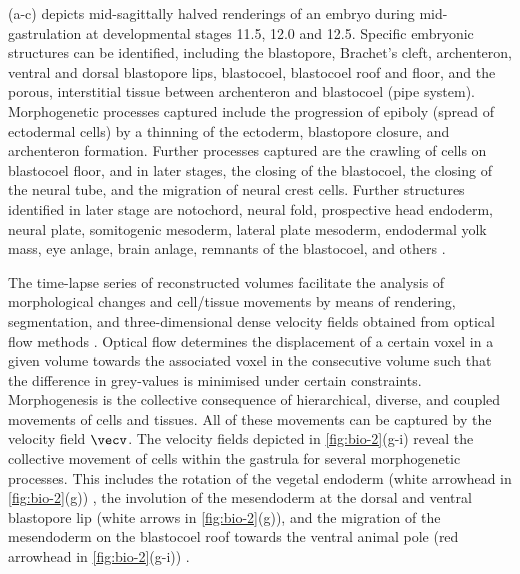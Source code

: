 \documentclass[
twoside,
openright,
titlepage,
numbers=noenddot,
headinclude,
fleqn,
a4paper,
footinclude=true,
cleardoublepage=empty,
abstractoff,
BCOR=5mm,
paper=a4,
fontsize=11pt,
british,ngerman,american,
]{scrreprt}
\begin{document}
(a-c) depicts mid-sagittally halved renderings of an
embryo during mid-gastrulation at developmental stages 11.5, 12.0 and
12.5.  Specific embryonic structures can be identified, including the
blastopore, Brachet's cleft, archenteron, ventral and dorsal
blastopore lips, blastocoel, blastocoel roof and floor, and the
porous, interstitial tissue between archenteron and blastocoel (pipe
system).  Morphogenetic processes captured include the progression of
epiboly (spread of ectodermal cells) by a thinning of the ectoderm,
blastopore closure, and archenteron formation.  Further processes
captured are the crawling of cells on blastocoel floor, and in later
stages, the closing of the blastocoel, the closing of the neural tube,
and the migration of neural crest cells.  Further structures
identified in later stage are notochord, neural fold, prospective head
endoderm, neural plate, somitogenic mesoderm, lateral plate mesoderm,
endodermal yolk mass, eye anlage, brain anlage, remnants of the
blastocoel, and others \cite{Moosmann2013nature,Moosmann2013Xenbase}.

The time-lapse series of reconstructed volumes facilitate the analysis
of morphological changes and cell/tissue movements by means of
rendering, segmentation, and three-dimensional dense velocity fields
obtained from optical flow methods \cite{Brox2004}.  Optical flow
determines the displacement of a certain voxel in a given volume
towards the associated voxel in the consecutive volume such that the
difference in grey-values is minimised under certain constraints.
Morphogenesis is the collective consequence of hierarchical, diverse,
and coupled movements of cells and tissues.  All of these movements
can be captured by the velocity field $\vecv$.  The velocity fields
depicted in \cref{fig:bio-2}(g-i) reveal the collective movement of
cells within the gastrula for several morphogenetic processes.  This
includes the rotation of the vegetal endoderm (white arrowhead in
\cref{fig:bio-2}(g)) \cite{Winklbauer1999}, the involution of the
mesendoderm at the dorsal and ventral blastopore lip (white arrows in
\cref{fig:bio-2}(g)), and the migration of the mesendoderm on the
blastocoel roof towards the ventral animal pole (red arrowhead in
\cref{fig:bio-2}(g-i)) \cite{Keller2003}.
\end{document}
